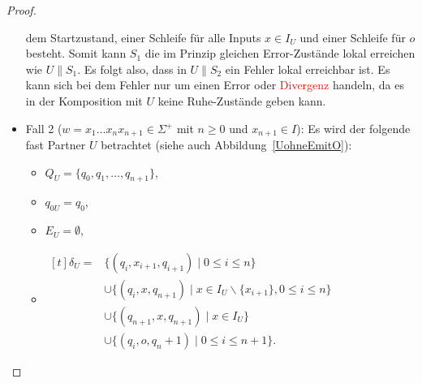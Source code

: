 \begin{proof}
\begin{itemize}
      dem Startzustand, einer Schleife für alle Inputs $x\in I_U$ und einer
      Schleife für $o$ besteht. Somit kann $S_1$ die im Prinzip gleichen
      Error-Zustände lokal erreichen wie $U\|S_1$. Es folgt also, dass in
      $U\|S_2$ ein Fehler lokal erreichbar ist. Es kann sich bei dem Fehler nur
      um einen Error oder \textcolor{red}{Divergenz} handeln, da es in der Komposition mit $U$
      keine Ruhe-Zustände geben kann.
    \item Fall 2 ($w=x_1\dots x_nx_{n+1}\in\Sigma{} ^+$ mit $n\geq 0$ und
      $x_{n+1}\in I$): Es wird der folgende fast Partner $U$ betrachtet (siehe
      auch Abbildung~\ref{UohneEmitO}):
      \begin{itemize}
        \item $Q_U=\{q_0,q_1,\dots ,q_{n+1}\}$,
        \item $q_{0U}=q_0$,
        \item $E_U=\emptyset$,
        \item $\begin{aligned}[t]
            \delta _U=&\{(q_i,x_{i+1},q_{i+1})\mid  0\leq i\leq n\}\\
                      &\cup\{(q_i,x,q_{n+1})\mid  x\in I_U\backslash\{x_{i+1}\},
          0\leq i\leq n\}\\
          &\cup\{(q_{n+1},x,q_{n+1})\mid  x\in I_U\}\\
          &\cup\{(q_i,o,q_n+1)\mid 0\leq i\leq n+1\}.
        \end{aligned}$
      \end{itemize}
      \begin{figure} [h!tbp]
      \begin{center}
\end{center}
\end{figure}
\end{itemize}
\end{proof}
